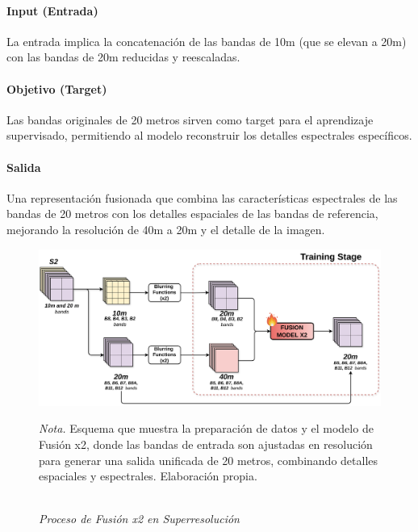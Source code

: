             \paragraph{Input (Entrada)}

                La entrada implica la concatenación de las bandas de 10m (que se elevan a 20m) con las bandas de 20m reducidas y reescaladas.

            \paragraph{Objetivo (Target)}

                Las bandas originales de 20 metros sirven como target para el aprendizaje supervisado, permitiendo al modelo reconstruir los detalles espectrales específicos.

            \paragraph{Salida}

                Una representación fusionada que combina las características espectrales de las bandas de 20 metros con los detalles espaciales de las bandas de referencia, mejorando la resolución de 40m a 20m y el detalle de la imagen.
        
            \begin{figure}[H] 
                \caption{\doublespacing \\ \textit{Proceso de Fusión x2 en Superresolución}} 
                \centering
                \includegraphics[width=1\linewidth]{images/fusionx2_training.png}
                \begin{justify}
                    \textit{Nota.} Esquema que muestra la preparación de datos y el modelo de Fusión x2, donde las bandas de entrada son ajustadas en resolución para generar una salida unificada de 20 metros, combinando detalles espaciales y espectrales. Elaboración propia.
                \end{justify}                    
                \label{fig:fusionx2_training}
            \end{figure}

